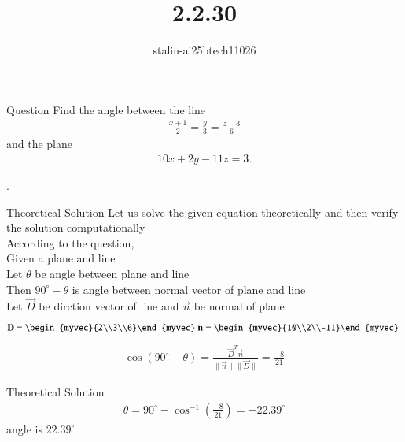 \documentclass{beamer}
\title %
{2.2.30}
\author %
{stalin-ai25btech11026}
\begin{document}
\frame{\titlepage}
\begin{frame}{Question}
 Find the angle between the line 
\begin{align}
\frac{x+1}{2} = \frac{y}{3} = \frac{z-3}{6}
\end{align}
and the plane 
\begin{align}
10x + 2y - 11z = 3.
\end{align}

.\\ 
\end{frame}
\begin{frame}{Theoretical Solution}
Let us solve the given equation theoretically and then verify the solution computationally \\
According to the question, \\
Given a plane and line\\
Let $\theta$ be angle between plane and line\\
Then $90^\circ-\theta$ is angle between normal vector of plane and line\\
Let $\vec{D}$ be dirction vector of line and $\vec{n}$ be normal of plane\\
\begin{align}
\vec{D}=\begin{myvec}{2\\3\\6}\end{myvec}\
\vec{n}=\begin{myvec}{10\\2\\-11}\end{myvec}\
\end{align}
\begin{align}
   \cos(90^\circ-\theta)=\frac{\vec{D}^T\vec{n}}{\|\vec{n}\|\|\vec{D}\|}=\frac{-8}{21}
\end{align}


\end{frame}
\begin{frame}{Theoretical Solution}
\begin{align}
    \theta=90^\circ-\cos^{-1} (\frac{-8}{21})=-22.39^\circ
\end{align}
angle is $22.39^\circ$
\end{frame}
\end{document}
